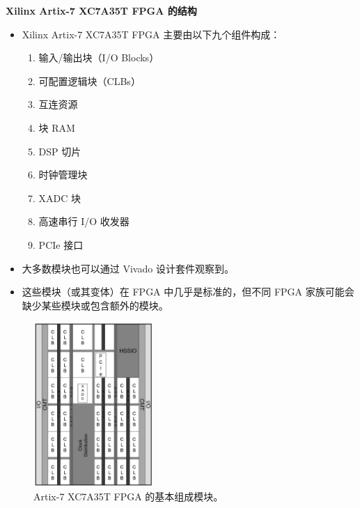 \begin{frame}[allowframebreaks]{\textbf{Xilinx Artix-7 XC7A35T FPGA 的结构}}
\begin{itemize}
\tightlist
\item
    Xilinx Artix-7 XC7A35T FPGA 主要由以下九个组件构成：

    \begin{enumerate}
    \tightlist
    \item
    输入/输出块（I/O Blocks）
    \item
    可配置逻辑块（CLBs）
    \item
    互连资源
    \item
    块 RAM
    \item
    DSP 切片
    \item
    时钟管理块
    \item
    XADC 块
    \item
    高速串行 I/O 收发器
    \item
    PCIe 接口
    \end{enumerate}
\item
    大多数模块也可以通过 Vivado 设计套件观察到。
\item
    这些模块（或其变体）在 FPGA 中几乎是标准的，但不同 FPGA
    家族可能会缺少某些模块或包含额外的模块。
\end{itemize}

\begin{figure}
    \centering
    \includegraphics[width=0.4\textwidth,keepaspectratio]{img1/XC7A35T.jpeg}
    \caption{Artix-7 XC7A35T FPGA 的基本组成模块。}
\end{figure}

\end{frame}

